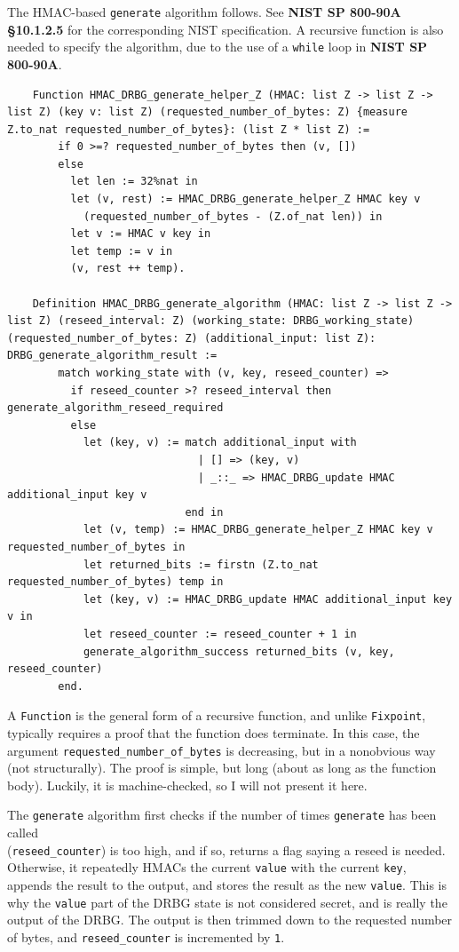 \documentclass[pageno]{jpaper}
\newcommand{\stdtitle}[1]{\textbf{#1}}
\begin{document}
The HMAC-based \lstinline{generate} algorithm follows. See \stdtitle{NIST SP 800-90A \S 10.1.2.5} for the corresponding NIST specification. A recursive function is also needed to specify the algorithm, due to the use of a \lstinline{while} loop in \stdtitle{NIST SP 800-90A}.


\begin{lstlisting}
    Function HMAC_DRBG_generate_helper_Z (HMAC: list Z -> list Z -> list Z) (key v: list Z) (requested_number_of_bytes: Z) {measure Z.to_nat requested_number_of_bytes}: (list Z * list Z) :=
        if 0 >=? requested_number_of_bytes then (v, [])
        else
          let len := 32%nat in
          let (v, rest) := HMAC_DRBG_generate_helper_Z HMAC key v
            (requested_number_of_bytes - (Z.of_nat len)) in
          let v := HMAC v key in
          let temp := v in
          (v, rest ++ temp).

    Definition HMAC_DRBG_generate_algorithm (HMAC: list Z -> list Z -> list Z) (reseed_interval: Z) (working_state: DRBG_working_state) (requested_number_of_bytes: Z) (additional_input: list Z): DRBG_generate_algorithm_result :=
        match working_state with (v, key, reseed_counter) =>
          if reseed_counter >? reseed_interval then generate_algorithm_reseed_required
          else
            let (key, v) := match additional_input with
                              | [] => (key, v)
                              | _::_ => HMAC_DRBG_update HMAC additional_input key v
                            end in
            let (v, temp) := HMAC_DRBG_generate_helper_Z HMAC key v requested_number_of_bytes in
            let returned_bits := firstn (Z.to_nat requested_number_of_bytes) temp in
            let (key, v) := HMAC_DRBG_update HMAC additional_input key v in
            let reseed_counter := reseed_counter + 1 in
            generate_algorithm_success returned_bits (v, key, reseed_counter)
        end.
\end{lstlisting}

A \lstinline{Function} is the general form of a recursive function, and unlike \lstinline{Fixpoint}, typically requires a proof that the function does terminate. In this case, the argument \lstinline{requested_number_of_bytes} is decreasing, but in a nonobvious way (not structurally). The proof is simple, but long (about as long as the function body). Luckily, it is machine-checked, so I will not present it here.

The \lstinline{generate} algorithm first checks if the number of times \lstinline{generate} has been called\\ (\lstinline{reseed_counter}) is too high, and if so, returns a flag saying a reseed is needed. Otherwise, it repeatedly HMACs the current \lstinline{value} with the current \lstinline{key}, appends the result to the output, and stores the result as the new \lstinline{value}. This is why the \lstinline{value} part of the DRBG state is not considered secret, and is really the output of the DRBG. The output is then trimmed down to the requested number of bytes, and \lstinline{reseed_counter} is incremented by \lstinline{1}.
\end{document}
